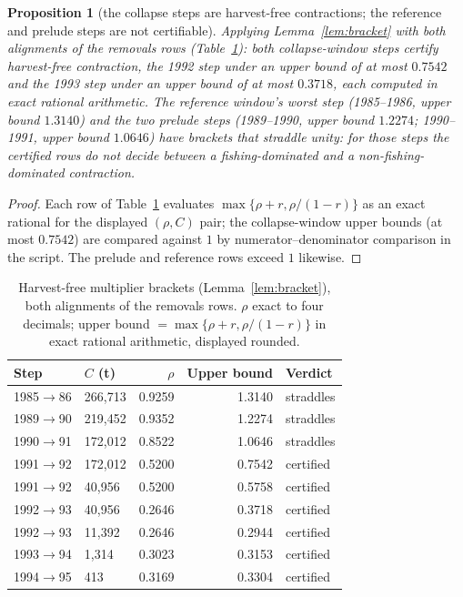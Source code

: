 \documentclass[10pt,twocolumn]{article}
\theoremstyle{plain}
\newtheorem{proposition}[theorem]{Proposition}
\theoremstyle{remark}
\begin{document}
\begin{proposition}[the collapse steps are harvest-free contractions;
the reference and prelude steps are not certifiable]
\label{prop:brackets}
Applying Lemma~\ref{lem:bracket} with both alignments of the removals
rows (Table~\ref{tab:brackets}): both collapse-window steps certify
harvest-free contraction, the 1992 step under an upper bound of at
most \(0.7542\) and the 1993 step under an upper bound of at most
\(0.3718\), each computed in exact rational arithmetic. The reference
window's worst step (1985--1986, upper bound \(1.3140\)) and the two
prelude steps (1989--1990, upper bound \(1.2274\); 1990--1991, upper
bound \(1.0646\)) have brackets that straddle unity: for those steps
the certified rows do not decide between a fishing-dominated and a
non-fishing-dominated contraction.
\end{proposition}

\begin{proof}
Each row of Table~\ref{tab:brackets} evaluates
\(\max\{\rho + r, \rho/(1-r)\}\) as an exact rational for the displayed
\((\rho, C)\) pair; the collapse-window upper bounds (at most
\(0.7542\)) are compared against \(1\) by
numerator--denominator comparison in the script. The prelude and
reference rows exceed \(1\) likewise.
\end{proof}

\begin{table}[t]
\centering
\scriptsize
\setlength{\tabcolsep}{3.2pt}
\caption{Harvest-free multiplier brackets (Lemma~\ref{lem:bracket}),
both alignments of the removals rows. \(\rho\) exact to four decimals;
upper bound \(=\max\{\rho+r, \rho/(1-r)\}\) in exact rational
arithmetic, displayed rounded.}
\label{tab:brackets}
\begin{tabular}{@{}l l r r l@{}}
\toprule
Step & \(C\) (t) & \(\rho\) & Upper bound & Verdict \\
\midrule
1985$\to$86 & 266{,}713 & 0.9259 & 1.3140 & straddles \\
1989$\to$90 & 219{,}452 & 0.9352 & 1.2274 & straddles \\
1990$\to$91 & 172{,}012 & 0.8522 & 1.0646 & straddles \\
1991$\to$92 & 172{,}012 & 0.5200 & 0.7542 & certified \\
1991$\to$92 & 40{,}956 & 0.5200 & 0.5758 & certified \\
1992$\to$93 & 40{,}956 & 0.2646 & 0.3718 & certified \\
1992$\to$93 & 11{,}392 & 0.2646 & 0.2944 & certified \\
1993$\to$94 & 1{,}314 & 0.3023 & 0.3153 & certified \\
1994$\to$95 & 413 & 0.3169 & 0.3304 & certified \\
\bottomrule
\end{tabular}
\end{table}
\end{document}
